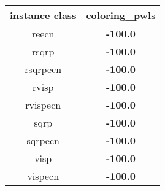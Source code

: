 \begin{tabular}{c|c}
instance class & coloring\_pwls \\ 
\hline
reecn        & {\bf -100.0} \\ 
rsqrp        & {\bf -100.0} \\ 
rsqrpecn     & {\bf -100.0} \\ 
rvisp        & {\bf -100.0} \\ 
rvispecn     & {\bf -100.0} \\ 
sqrp         & {\bf -100.0} \\ 
sqrpecn      & {\bf -100.0} \\ 
visp         & {\bf -100.0} \\ 
vispecn      & {\bf -100.0} \\ 
\end{tabular}